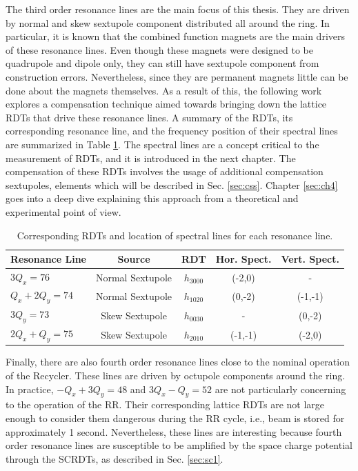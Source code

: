 The third order resonance lines are the main focus of this thesis. They are driven by normal and skew sextupole component distributed all around the ring. In particular, it is known that the combined function magnets are the main drivers of these resonance lines. Even though these magnets were designed to be quadrupole and dipole only, they can still have sextupole component from construction errors. Nevertheless, since they are permanent magnets little can be done about the magnets themselves. As a result of this, the following work explores a compensation technique aimed towards bringing down the lattice RDTs that drive these resonance lines. A summary of the RDTs, its corresponding resonance line, and the frequency position of their spectral lines are summarized in Table \ref{tab:rdtlines}. The spectral lines are a concept critical to the measurement of RDTs, and it is introduced in the next chapter. The compensation of these RDTs involves the usage of additional compensation sextupoles, elements which will be described in Sec. \ref{sec:css}. Chapter \ref{sec:ch4} goes into a deep dive explaining this approach from a theoretical and experimental point of view. 

\begin{table}[H]
   \centering
   \caption{Corresponding RDTs and location of spectral lines for each resonance line.}
   \begin{tabular}{lcccc}
       \toprule
       \textbf{Resonance Line} & \textbf{Source} & \textbf{RDT} & \textbf{Hor. Spect.} & \textbf{Vert. Spect.} \\
       \midrule
           $3Q_x=76$     & Normal Sextupole    & $h_{3000}$           &  (-2,0)  & -       \\ %
          $Q_x+2Q_y=74$   & Normal Sextupole    & $h_{1020}$            & (0,-2) & (-1,-1)       \\ %
           $3Q_y=73$     & Skew Sextupole   & $h_{0030}$           & - & (0,-2)        \\ %
           $2Q_x+Q_y=75$   & Skew Sextupole    & $h_{2010}$     & (-1,-1) & (-2,0)       \\
       \bottomrule
   \end{tabular}
   \label{tab:rdtlines}
\end{table}

Finally, there are also fourth order resonance lines close to the nominal operation of the Recycler. These lines are driven by octupole components around the ring. In practice, $-Q_x+3Q_y = 48$ and $3Q_x-Q_y = 52$ are not particularly concerning to the operation of the RR. Their corresponding lattice RDTs are not large enough to consider them dangerous during the RR cycle, i.e., beam is stored for approximately 1 second. Nevertheless, these lines are interesting because fourth order resonance lines are susceptible to be amplified by the space charge potential through the SCRDTs, as described in Sec. \ref{sec:sc1}.    

